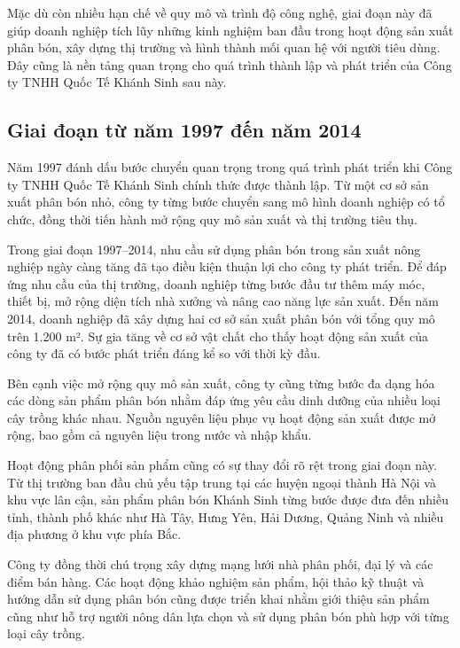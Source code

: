 Mặc dù còn nhiều hạn chế về quy mô và trình độ công nghệ, giai đoạn này đã giúp doanh nghiệp tích lũy những kinh nghiệm ban đầu trong hoạt động sản xuất phân bón, xây dựng thị trường và hình thành mối quan hệ với người tiêu dùng. 
Đây cũng là nền tảng quan trọng cho quá trình thành lập và phát triển của Công ty TNHH Quốc Tế Khánh Sinh sau này.

\subsection{Giai đoạn từ năm 1997 đến năm 2014}
Năm 1997 đánh dấu bước chuyển quan trọng trong quá trình phát triển khi Công ty TNHH Quốc Tế Khánh Sinh chính thức được thành lập.\cite{company-internal-documents} 
Từ một cơ sở sản xuất phân bón nhỏ, công ty từng bước chuyển sang mô hình doanh nghiệp có tổ chức, đồng thời tiến hành mở rộng quy mô sản xuất và thị trường tiêu thụ.

Trong giai đoạn 1997–2014, nhu cầu sử dụng phân bón trong sản xuất nông nghiệp ngày càng tăng đã tạo điều kiện thuận lợi cho công ty phát triển. 
Để đáp ứng nhu cầu của thị trường, doanh nghiệp từng bước đầu tư thêm máy móc, thiết bị, mở rộng diện tích nhà xưởng và nâng cao năng lực sản xuất.
Đến năm 2014, doanh nghiệp đã xây dựng hai cơ sở sản xuất phân bón với tổng quy mô trên 1.200 m². \cite{company-internal-documents} 
Sự gia tăng về cơ sở vật chất cho thấy hoạt động sản xuất của công ty đã có bước phát triển đáng kể so với thời kỳ đầu.

Bên cạnh việc mở rộng quy mô sản xuất, công ty cũng từng bước đa dạng hóa các dòng sản phẩm phân bón nhằm đáp ứng yêu cầu dinh dưỡng của nhiều loại cây trồng khác nhau. \cite{company-internal-documents} 
Nguồn nguyên liệu phục vụ hoạt động sản xuất được mở rộng, bao gồm cả nguyên liệu trong nước và nhập khẩu. \cite{company-internal-documents} 

Hoạt động phân phối sản phẩm cũng có sự thay đổi rõ rệt trong giai đoạn này. 
Từ thị trường ban đầu chủ yếu tập trung tại các huyện ngoại thành Hà Nội và khu vực lân cận, sản phẩm phân bón Khánh Sinh từng bước được đưa đến nhiều tỉnh, thành phố khác như Hà Tây, Hưng Yên, Hải Dương, Quảng Ninh và nhiều địa phương ở khu vực phía Bắc. \cite{company-internal-documents} 

Công ty đồng thời chú trọng xây dựng mạng lưới nhà phân phối, đại lý và các điểm bán hàng. 
Các hoạt động khảo nghiệm sản phẩm, hội thảo kỹ thuật và hướng dẫn sử dụng phân bón cũng được triển khai nhằm giới thiệu sản phẩm cũng như hỗ trợ người nông dân lựa chọn và sử dụng phân bón phù hợp với từng loại cây trồng.\cite{company-internal-documents}

